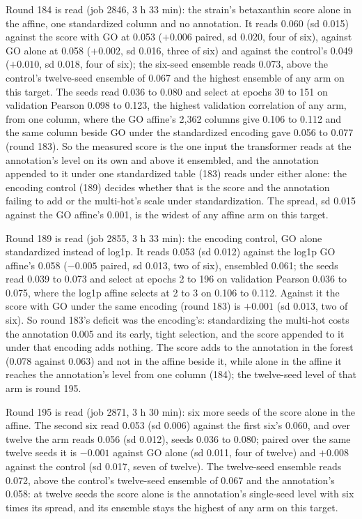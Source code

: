 Round 184 is read (job 2846, 3 h 33 min): the strain's betaxanthin score alone in the
affine, one standardized column and no annotation. It reads 0.060 (sd 0.015) against
the score with GO at 0.053 ($+0.006$ paired, sd 0.020, four of six), against GO alone
at 0.058 ($+0.002$, sd 0.016, three of six) and against the control's 0.049 ($+0.010$,
sd 0.018, four of six); the six-seed ensemble reads 0.073, above the control's
twelve-seed ensemble of 0.067 and the highest ensemble of any arm on this target. The
seeds read 0.036 to 0.080 and select at epochs 30 to 151 on validation Pearson 0.098 to
0.123, the highest validation correlation of any arm, from one column, where the GO
affine's 2,362 columns give 0.106 to 0.112 and the same column beside GO under the
standardized encoding gave 0.056 to 0.077 (round 183). So the measured score is the
one input the transformer reads at the annotation's level on its own and above it
ensembled, and the annotation appended to it under one standardized table (183) reads
under either alone: the encoding control (189) decides whether that is the score and
the annotation failing to add or the multi-hot's scale under standardization. The
spread, sd 0.015 against the GO affine's 0.001, is the widest of any affine arm on
this target.

Round 189 is read (job 2855, 3 h 33 min): the encoding control, GO alone standardized
instead of log1p. It reads 0.053 (sd 0.012) against the log1p GO affine's 0.058
($-0.005$ paired, sd 0.013, two of six), ensembled 0.061; the seeds read 0.039 to 0.073
and select at epochs 2 to 196 on validation Pearson 0.036 to 0.075, where the log1p
affine selects at 2 to 3 on 0.106 to 0.112. Against it the score with GO under the same
encoding (round 183) is $+0.001$ (sd 0.013, two of six). So round 183's deficit was the
encoding's: standardizing the multi-hot costs the annotation 0.005 and its early,
tight selection, and the score appended to it under that encoding adds nothing. The
score adds to the annotation in the forest (0.078 against 0.063) and not in the affine
beside it, while alone in the affine it reaches the annotation's level from one column
(184); the twelve-seed level of that arm is round 195.

Round 195 is read (job 2871, 3 h 30 min): six more seeds of the score alone in the
affine. The second six read 0.053 (sd 0.006) against the first six's 0.060, and over
twelve the arm reads 0.056 (sd 0.012), seeds 0.036 to 0.080; paired over the same
twelve seeds it is $-0.001$ against GO alone (sd 0.011, four of twelve) and $+0.008$
against the control (sd 0.017, seven of twelve). The twelve-seed ensemble reads 0.072,
above the control's twelve-seed ensemble of 0.067 and the annotation's 0.058: at
twelve seeds the score alone is the annotation's single-seed level with six times its
spread, and its ensemble stays the highest of any arm on this target.

